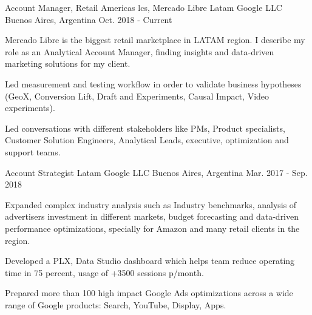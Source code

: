 

\begin{cventries}

  \cventry
    {Account Manager, Retail Americas lcs, Mercado Libre Latam} %
    {Google LLC} %
    {Buenos Aires, Argentina} %
    {Oct. 2018 - Current} %
    {
      \begin{cvitems} %
        \item {Mercado Libre is the biggest retail marketplace in LATAM region. I describe my role as an Analytical Account Manager, finding insights and data-driven marketing solutions for my client.}
        \item {Led measurement and testing workflow in order to validate business hypotheses (GeoX, Conversion Lift, Draft and Experiments, Causal Impact, Video experiments).}
        \item {Led conversations with different stakeholders like PMs, Product specialists, Customer Solution Engineers, Analytical Leads, executive, optimization and support teams.}
      \end{cvitems}
    }

  \cventry
    {Account Strategist Latam} %
    {Google LLC} %
    {Buenos Aires, Argentina} %
    {Mar. 2017 - Sep. 2018} %
    {
      \begin{cvitems} %
        \item {Expanded complex industry analysis such as Industry benchmarks, analysis of advertisers investment in different markets, budget forecasting and data-driven performance optimizations, specially for Amazon and many retail clients in the region.}
        \item {Developed a PLX, Data Studio dashboard which helps team reduce operating time in 75 percent, usage of +3500 sessions p/month.}
        \item {Prepared more than 100 high impact Google Ads optimizations across a wide range of Google products: Search, YouTube, Display, Apps.}
      \end{cvitems}
    }


\end{cventries}
